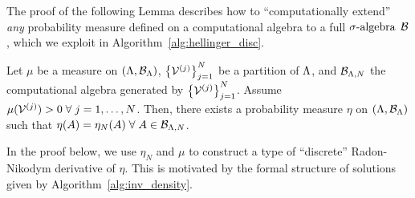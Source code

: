 The proof of the following Lemma describes how to ``computationally extend'' {\em any} probability measure defined on a computational algebra to a full $\sigma\text{-algebra}$ $\mathcal{B}$, which we exploit in Algorithm~\ref{alg:hellinger_disc}.
\begin{lem}
\label{lem:measuresets}
Let $\mu$ be a measure on $({\Lambda}, \mathcal{B}_{\Lambda})$, $\left\{\mathcal{V}^{(j)}\right\}_{j=1}^{N}$ be a partition of ${\Lambda}$, and $\mathcal{B}_{{\Lambda}, N}$ the computational algebra generated by $\left\{\mathcal{V}^{(j)}\right\}_{j=1}^{N}$. 
Assume $\mu (\mathcal{V}^{(j)}) > 0 \; \forall \; j=1,\hdots, N$. 
Then, there exists a probability measure $\eta$ on $({\Lambda}, \mathcal{B}_{\Lambda})$ such that $\eta(A) = \eta_N(A) \; \forall \; A\in\mathcal{B}_{{\Lambda}, N}$. 
\end{lem}
In the proof below, we use $\eta_N$ and $\mu$ to construct a type of ``discrete'' Radon-Nikodym derivative of $\eta$. 
This is motivated by the formal structure of solutions given by Algorithm~\ref{alg:inv_density}.

